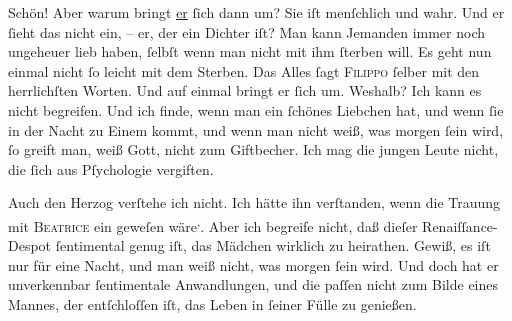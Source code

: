                Schön! Aber warum bringt \uline{er}{ }ſich dann um? Sie iſt
               menſchlich und wahr. Und er{ }ſieht das nicht ein, – er, der ein Dichter iſt? Man kann
               Jemanden immer noch ungeheuer lieb haben,{ }ſelbſt wenn man nicht mit ihm{ }ſterben will.
               Es geht {\pb}nun einmal nicht{ }ſo leicht mit dem Sterben.
               Das Alles{ }ſagt \textsc{Filippo}{ }ſelber mit den herrlichſten Worten. Und auf einmal bringt er{ }ſich um. Weshalb?
               Ich kann es nicht begreifen. Und ich finde, wenn man ein{ }ſchönes Liebchen hat, und
               wenn{ }ſie in der Nacht zu Einem kommt, und wenn man nicht weiß, was morgen{ }ſein wird,{ }ſo greift man, weiß Gott, nicht zum Giftbecher.  Ich mag die jungen {\pb}Leute nicht, die{ }ſich aus Pſychologie vergiften.\pend
           
\pstart
           Auch den Herzog verſtehe ich
               nicht. Ich hätte ihn verſtanden, wenn die Trauung mit \textsc{Beatrice}{ } ein \label{K_L02904-3v}\label{K_L02904-3} geweſen wäre\substVorne{}\textsuperscript{,}\substDazwischen{}.\substHinten{} Aber ich begreife nicht, daß dieſer Renaiſſance-Despot{ }ſentimental genug
               iſt, das Mädchen wirklich zu heirathen.  Gewiß, es iſt nur für eine Nacht, und man weiß nicht, was morgen{ }ſein wird.
               Und doch hat er unverkennbar{ }ſentimentale Anwandlungen, und die {\pb}paſſen nicht zum Bilde eines Mannes, der
               entſchloſſen iſt, das Leben in{ }ſeiner Fülle zu genießen. \strikeout{\textcolor{gray}{×}\-\textcolor{gray}{×}\-\textcolor{gray}{×}\-\textcolor{gray}{×}\-\textcolor{gray}{×}\-\textcolor{gray}{×}\-\textcolor{gray}{×}\-\textcolor{gray}{×}\-\textcolor{gray}{×}\-\textcolor{gray}{×}\-\textcolor{gray}{×}\-\textcolor{gray}{×}\-\textcolor{gray}{×}\-\textcolor{gray}{×}\-\textcolor{gray}{×}}{ }\pend
           
